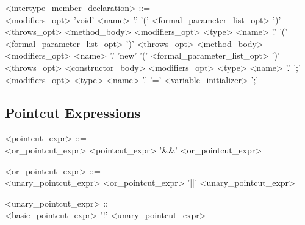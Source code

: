 \begin{minipage}{6in}
\begin{grammar}
<intertype_member_declaration> ::= \hspace{1in} \\
     {\red <modifiers_opt>} 'void' {\red <name>} '.' {}
     '(' {\red <formal_parameter_list_opt>} ')' {\red <throws_opt>}
     {\red <method_body>}
\alt 
     {\red <modifiers_opt>} {\red <type>} {\red <name>} '.' {}
     '(' {\red <formal_parameter_list_opt>} ')' {\red <throws_opt>}
     {\red <method_body>}
\alt 
     {\red <modifiers_opt>} {\red <name>} '.' 'new' 
     '(' {\red <formal_parameter_list_opt>} ')' {\red <throws_opt>}
     {\red <constructor_body>}
\alt
     {\red <modifiers_opt>} {\red <type>} {\red <name>} '.' 
     {} ';'
\alt
     {\red <modifiers_opt>} {\red <type>} {\red <name>} '.' 
     {} '=' {\red <variable_initializer>} ';'
\end{grammar}
\end{minipage}
 
 
\subsection{Pointcut Expressions}

\begin{minipage}{6in}
\begin{grammar}
\begin{blue}
<pointcut_expr> ::= \hspace{1in} \\
       <or_pointcut_expr> 
\alt   <pointcut_expr> '\&\&' <or_pointcut_expr>

<or_pointcut_expr> ::= \hspace{1in} \\
       <unary_pointcut_expr> 
\alt   <or_pointcut_expr> '||' <unary_pointcut_expr>

<unary_pointcut_expr> ::= \hspace{1in} \\
       <basic_pointcut_expr> 
\alt   '!' <unary_pointcut_expr>
\end{blue}
\end{grammar}
\end{minipage}

